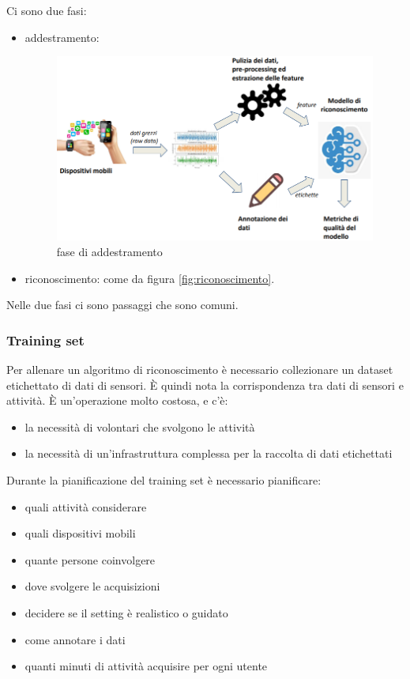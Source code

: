 \newpage
Ci sono due fasi:
\begin{itemize}
    \item addestramento: 
        \begin{figure}[!ht]
            \centering
            \includegraphics[width=.95\textwidth]{images/MobiDEV/6. activity recognition/addestramento.PNG}
            \caption{fase di addestramento}
            \label{fig:addestramento}
        \end{figure}
    \item riconoscimento: come da figura \ref{fig:riconoscimento}.
\end{itemize} 
Nelle due fasi ci sono passaggi che sono comuni.

\subsubsection{Training set}
Per allenare un algoritmo di riconoscimento è necessario collezionare un dataset etichettato di dati di sensori. È quindi nota la corrispondenza tra dati di sensori e attività. 
È un'operazione molto costosa, e c'è:
\begin{itemize}
    \item la necessità di volontari che svolgono le attività 
    \item la necessità di un’infrastruttura complessa per la raccolta di dati etichettati
\end{itemize} 

Durante la pianificazione del training set è necessario pianificare:
\begin{itemize}
    \item quali attività considerare
    \item quali dispositivi mobili
    \item quante persone coinvolgere
    \item dove svolgere le acquisizioni
    \item decidere se il setting è realistico o guidato
    \item come annotare i dati
    \item quanti minuti di attività acquisire per ogni utente
\end{itemize} 

